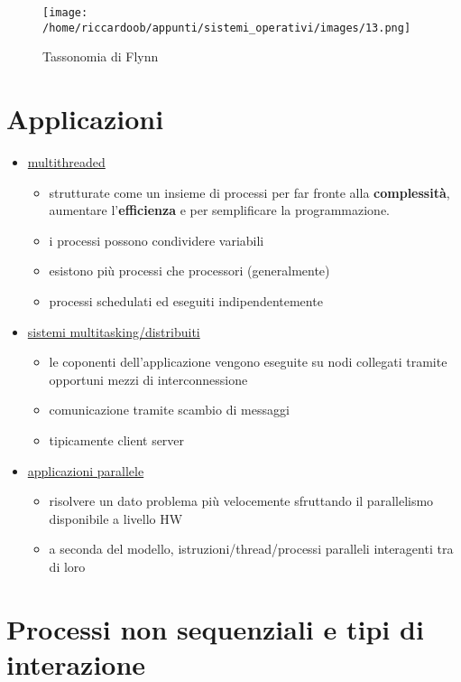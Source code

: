 \begin{figure}[H]
    \caption{Tassonomia di Flynn}
    \centering
    \texttt{[image: /home/riccardoob/appunti/sistemi\_operativi/images/13.png]}
\end{figure}

\section{Applicazioni}

\begin{itemize}
    \item \underline{multithreaded} 
    \begin{itemize}
        \item strutturate come un insieme di processi per far fronte alla \textbf{complessità}, aumentare l'\textbf{efficienza} e per semplificare la programmazione.
        \item i processi possono condividere variabili
        \item esistono più processi che processori (generalmente)
        \item processi schedulati ed eseguiti indipendentemente
    \end{itemize}
    \item \underline{sistemi multitasking/distribuiti} 
    \begin{itemize}
        \item le coponenti dell'applicazione vengono eseguite su nodi collegati tramite opportuni mezzi di interconnessione
        \item comunicazione tramite scambio di messaggi
        \item tipicamente client server
    \end{itemize}
    \item \underline{applicazioni parallele} 
    \begin{itemize}
        \item risolvere un dato problema più velocemente sfruttando il parallelismo disponibile a livello HW
        \item a seconda del modello, istruzioni/thread/processi paralleli interagenti tra di loro
    \end{itemize}
\end{itemize}

\section{Processi non sequenziali e tipi di interazione}

